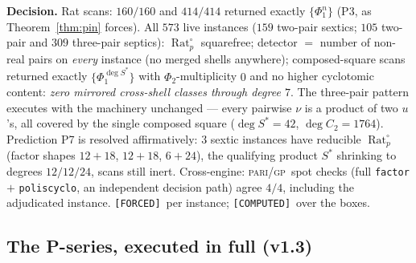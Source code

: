 \documentclass[11pt]{article}
\newcommand{\F}{\textnormal{\texttt{[FORCED]}}}
\newcommand{\C}{\textnormal{\texttt{[COMPUTED]}}}
\newcommand{\Rat}{\operatorname{Rat}}
\newcommand{\gp}{\textsc{pari/gp}}
\theoremstyle{definition}
\begin{document}
\textbf{Decision.} Rat scans: $160/160$ and $414/414$ returned exactly
$\{\Phi_1^{n}\}$ (P3, as Theorem~\ref{thm:pin} forces). All $573$ live
instances ($159$ two-pair sextics; $105$ two-pair and $309$ three-pair
septics): $\Rat_p^{\circ}$ squarefree; detector $=$ number of non-real
pairs on \emph{every} instance (no merged shells anywhere); composed-square
scans returned exactly $\{\Phi_1^{\deg S^{*}}\}$ with $\Phi_2$-multiplicity
$0$ and no higher cyclotomic content: \emph{zero mirrored cross-shell
classes through degree $7$}. The three-pair pattern executes with the
machinery unchanged --- every pairwise $\nu$ is a product of two $u$'s,
all covered by the single composed square ($\deg S^{*}=42$,
$\deg C_2=1764$). Prediction P7 is resolved affirmatively: $3$ sextic
instances have reducible $\Rat_p^{\circ}$ (factor shapes $12{+}18$,
$12{+}18$, $6{+}24$), the qualifying product $S^{*}$ shrinking to degrees
$12/12/24$, scans still inert. Cross-engine: \gp\ spot checks (full
\texttt{factor} $+$ \texttt{poliscyclo}, an independent decision path)
agree $4/4$, including the adjudicated instance. \F\ per instance; \C\
over the boxes.

\subsection{The P-series, executed in full (v1.3)}\label{sec:pseries}
\end{document}
